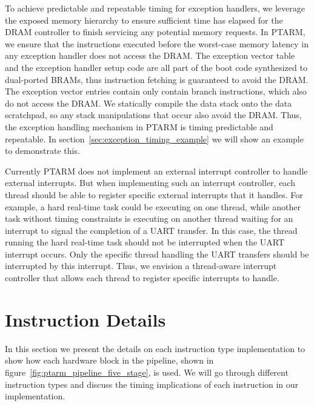 To achieve predictable and repeatable timing for exception handlers, we leverage the exposed memory hierarchy to ensure sufficient time has elapsed for the DRAM controller to finish servicing any potential memory requests. %
In PTARM, we ensure that the instructions executed before the worst-case memory latency in any exception handler does not access the DRAM.  
The exception vector table and the exception handler setup code are all part of the boot code synthesized to dual-ported BRAMs, thus instruction fetching is guaranteed to avoid the DRAM.
The exception vector entries contain only contain branch instructions, which also do not access the DRAM.
We statically compile the data stack onto the data scratchpad, so any stack manipulations that occur also avoid the DRAM.
Thus, the exception handling mechanism in PTARM is timing predictable and repeatable. 
In section~\ref{sec:exception_timing_example} we will show an example to demonstrate this.  

Currently PTARM does not implement an external interrupt controller to handle external interrupts. 
But when implementing such an interrupt controller, each thread should be able to register specific external interrupts that it handles.
For example, a hard real-time task could be executing on one thread, while another task without timing constraints is executing on another thread waiting for an interrupt to signal the completion of a UART transfer.
In this case, the thread running the hard real-time task should not be interrupted when the UART interrupt occurs.
Only the specific thread handling the UART transfers should be interrupted by this interrupt.  
Thus, we envision a thread-aware interrupt controller that allows each thread to register specific interrupts to handle.

\section{Instruction Details}
\label{sec:ptarm_instructions}
In this section we present the details on each instruction type implementation to show how each hardware block in the pipeline, shown in figure~\ref{fig:ptarm_pipeline_five_stage}, is used.
We will go through different instruction types and discuss the timing implications of each instruction in our implementation.
   
